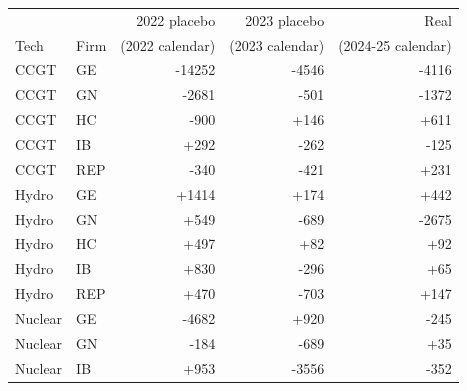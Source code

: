 \begin{tabular}{l l r r r}
\toprule
 & & 2022 placebo & 2023 placebo & Real \\
Tech & Firm & (2022 calendar) & (2023 calendar) & (2024-25 calendar) \\
\midrule
CCGT & GE & -14252 & -4546 & -4116 \\
CCGT & GN & -2681 & -501 & -1372 \\
CCGT & HC & -900 & +146 & +611 \\
CCGT & IB & +292 & -262 & -125 \\
CCGT & REP & -340 & -421 & +231 \\
Hydro & GE & +1414 & +174 & +442 \\
Hydro & GN & +549 & -689 & -2675 \\
Hydro & HC & +497 & +82 & +92 \\
Hydro & IB & +830 & -296 & +65 \\
Hydro & REP & +470 & -703 & +147 \\
Nuclear & GE & -4682 & +920 & -245 \\
Nuclear & GN & -184 & -689 & +35 \\
Nuclear & IB & +953 & -3556 & -352 \\
\bottomrule
\end{tabular}